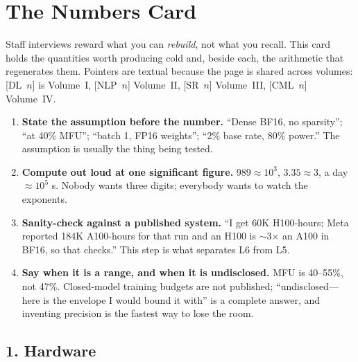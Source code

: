 
\chapter*{The Numbers Card}

Staff interviews reward what you can \emph{rebuild}, not what you recall. This
card holds the quantities worth producing cold and, beside each, the arithmetic
that regenerates them. Pointers are textual because the page is shared across
volumes: [DL~$n$] is Volume~I, [NLP~$n$] Volume~II, [SR~$n$] Volume~III,
[CML~$n$] Volume~IV.

\begin{keyinsight}
\begin{enumerate}[leftmargin=*,itemsep=1pt,topsep=2pt]
\item \textbf{State the assumption before the number.} ``Dense BF16, no
sparsity''; ``at 40\% MFU''; ``batch 1, FP16 weights''; ``2\% base rate, 80\%
power.'' The assumption is usually the thing being tested.
\item \textbf{Compute out loud at one significant figure.} $989 \approx 10^{3}$,
$3.35 \approx 3$, a day $\approx 10^{5}$ s. Nobody wants three digits; everybody
wants to watch the exponents.
\item \textbf{Sanity-check against a published system.} ``I get 60K H100-hours;
Meta reported 184K A100-hours for that run and an H100 is $\sim$3$\times$ an
A100 in BF16, so that checks.'' This step is what separates L6 from L5.
\item \textbf{Say when it is a range, and when it is undisclosed.} MFU is
40--55\%, not 47\%. Closed-model training budgets are not published;
``undisclosed---here is the envelope I would bound it with'' is a complete
answer, and inventing precision is the fastest way to lose the room.
\end{enumerate}
\end{keyinsight}

\section*{1. Hardware}

